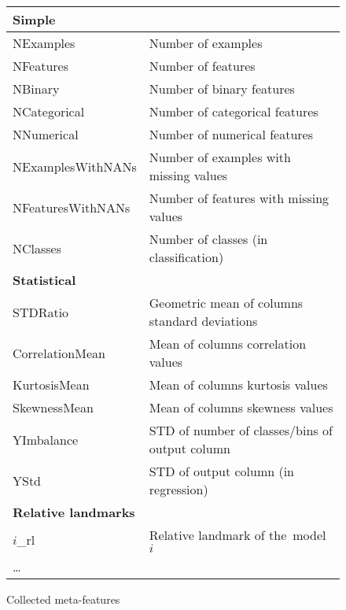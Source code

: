 \documentclass[hidelinks, english]{mvi-report}
\begin{document}


\begin{figure*}[t]
\center
    \begin{tabular}[c]{l l}
    \textbf{Simple}   & \\
    \hline
    NExamples         & Number of examples                      \\
    NFeatures         & Number of features                      \\
    NBinary           & Number of binary features               \\
    NCategorical      & Number of categorical features          \\
    NNumerical        & Number of numerical features            \\
    NExamplesWithNANs & Number of examples with missing values  \\
    NFeaturesWithNANs & Number of features with missing values  \\
    NClasses          & Number of classes (in classification)   \\
    \hline
    \textbf{Statistical}   & \\
    \hline
    STDRatio          & Geometric mean of columns standard deviations   \\
    CorrelationMean   & Mean of columns correlation values              \\
    KurtosisMean      & Mean of columns kurtosis values                 \\
    SkewnessMean      & Mean of columns skewness values                 \\
    YImbalance        & STD of number of classes/bins of output column  \\
    YStd              & STD of output column (in regression)            \\
    \hline
    \textbf{Relative landmarks}   & \\
    \hline
    $i$\_rl              & Relative landmark of the~model $i$ \\
    \dots                & \\
    \end{tabular}

\caption{Collected meta-features}
\label{fig:meta-features}
\end{figure*}
\end{document}
